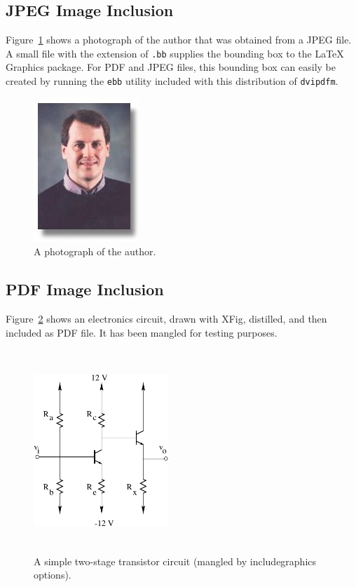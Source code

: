 \documentclass[dvipdfm]{article}
\begin{document}
\subsection{JPEG Image Inclusion}
Figure~\ref{fig:author}
shows a photograph of the author
that was obtained from a JPEG file.
A small file with the extension of {\tt .bb}
supplies the bounding box to the \LaTeX\space
Graphics package.  For PDF and JPEG files,
this bounding box can easily be created by running
the {\tt ebb} utility included with this
distribution of {\tt dvipdfm}.

\begin{figure}
  \begin{center}
    \includegraphics{mwicks.jpeg}
  \end{center}

  \caption{A photograph of the author.}
  \label{fig:author}
\end{figure}

\subsection{PDF Image Inclusion}
Figure~\ref{fig:circuit} shows
an electronics circuit,
drawn with XFig, distilled,
and then included as PDF file.
It has been mangled for testing purposes.
\begin{figure}
  \begin{center}
     \includegraphics[viewport=30 30 150 150,angle=20,width=2.0in,height=3.0in]{transistor}
  \end{center}

  \caption{A simple two-stage transistor circuit (mangled by includegraphics
options).}
  \label{fig:circuit}
\end{figure}
\end{document}

